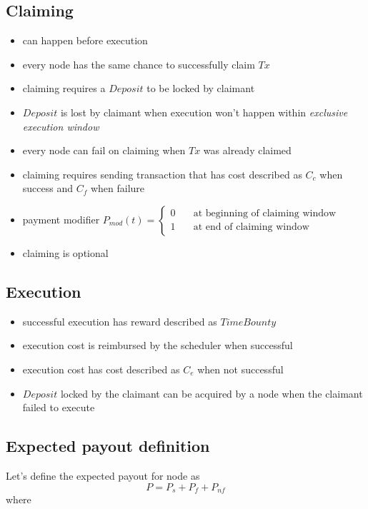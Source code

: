 \documentclass{article}
\begin{document}
  \subsection{Claiming}
  \begin{itemize}
  \item can happen before execution
  \item every node has the same chance to successfully claim $Tx$
  \item claiming requires a $Deposit$ to be locked by claimant
  \item $Deposit$ is lost by claimant when execution won't happen within \textit{exclusive execution window}
  \item every node can fail on claiming when $Tx$ was already claimed
  \item claiming requires sending transaction that has cost described as $C_{c}$ when success and $C_{f}$ when failure
  \item payment modifier $P_{mod}(t)=\begin{cases}
  0 & \quad \text{at beginning of claiming window}\\
  1 & \quad \text{at end of claiming window}
  \end{cases}$ 
  \item claiming is optional
  \end{itemize}
  
  \subsection{Execution}
  \begin{itemize}
  \item successful execution has reward described as $TimeBounty$ 
  \item execution cost is reimbursed by the scheduler when successful
  \item execution cost has cost described as $C_{e}$ when not successful
  \item $Deposit$ locked by the claimant can be acquired by a node when the claimant failed to execute
  \end{itemize}
  
  \subsection{Expected payout definition}
  Let's define the expected payout for node as
  \[
  P=P_{s}+P_{f}+P_{nf}
  \]
  where
  \\
  
\end{document}

